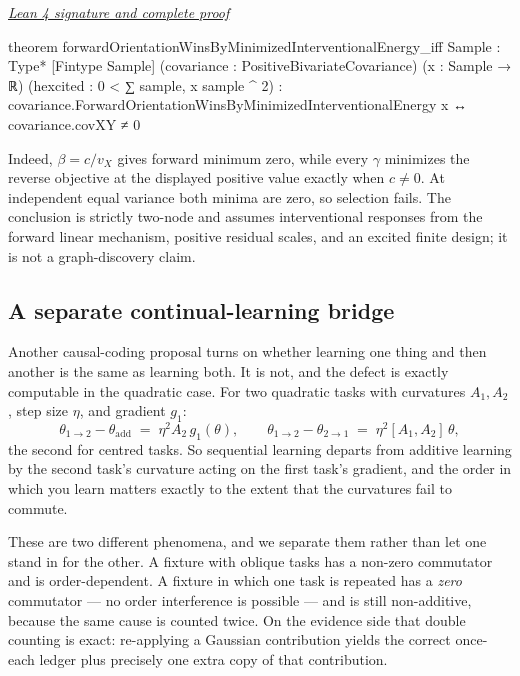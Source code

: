 \documentclass[11pt]{article}
\newcommand{\leancommit}{647168959fc57cfe97526d9525d33e63681b8e2f}
\newcommand{\leansignaturelink}[2]{%
  \par\Needspace{0.3\textheight}\smallskip\noindent
  \href{https://github.com/zariuq/MeTTapedia/blob/\leancommit/#1\#L#2}{%
    \scriptsize\itshape Lean 4 signature and complete proof}\par\nobreak}
\begin{document}
\leansignaturelink{lean/mettapedia/Mettapedia/MachineLearning/NeuralNetworks/%
PredictiveCoding/CausalDirectionSelection.lean}{316}
\begin{leansignature}
theorem forwardOrientationWinsByMinimizedInterventionalEnergy_iff
    {Sample : Type*} [Fintype Sample]
    (covariance : PositiveBivariateCovariance) (x : Sample → ℝ)
    (hexcited : 0 < ∑ sample, x sample ^ 2) :
    covariance.ForwardOrientationWinsByMinimizedInterventionalEnergy x ↔
      covariance.covXY ≠ 0
\end{leansignature}

Indeed, $\beta=c/v_X$ gives forward minimum zero, while every $\gamma$ minimizes the
reverse objective at the displayed positive value exactly when $c\ne0$.  At independent
equal variance both minima are zero, so selection fails.  The conclusion is strictly
two-node and assumes interventional responses from the forward linear mechanism,
positive residual scales, and an excited finite design; it is not a graph-discovery
claim.

\subsection{A separate continual-learning bridge}

Another causal-coding proposal turns on whether learning one thing and then another
is the same as learning both. It is not, and the defect is exactly computable in the
quadratic case. For two quadratic tasks with curvatures $A_1, A_2$, step size $\eta$, and
gradient $g_1$:
\[
\theta_{1\to2} - \theta_{\mathrm{add}} \;=\; \eta^2 A_2\, g_1(\theta),
\qquad
\theta_{1\to2} - \theta_{2\to1} \;=\; \eta^2 [A_1, A_2]\, \theta ,
\]
the second for centred tasks. So sequential learning departs from additive learning by the
second task's curvature acting on the first task's gradient, and the order in which you
learn matters exactly to the extent that the curvatures fail to commute.

These are two different phenomena, and we separate them rather than let one stand in for
the other. A fixture with oblique tasks has a non-zero commutator and is order-dependent.
A fixture in which one task is repeated has a \emph{zero} commutator --- no order
interference is possible --- and is still non-additive, because the same cause is counted
twice. On the evidence side that double counting is exact: re-applying a Gaussian
contribution yields the correct once-each ledger plus precisely one extra copy of that
contribution.
\end{document}
